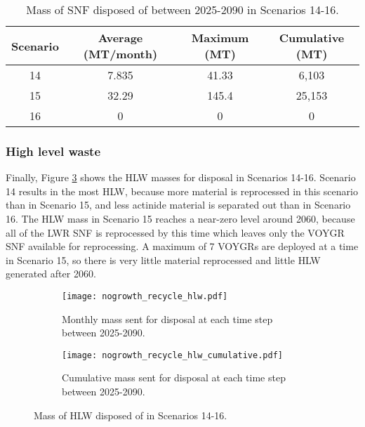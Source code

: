 \begin{table}[h!]
    \centering 
    \caption{Mass of SNF disposed of between 2025-2090 in 
    Scenarios 14-16.}
    \label{tab:s14-16_snf}
    \begin{tabular}{c c c c}
        \hline 
        Scenario & Average (MT/month) & Maximum (MT) & Cumulative (MT) \\
        \hline
        14 & 7.835 & 41.33 & 6,103\\
        15 & 32.29 & 145.4 & 25,153 \\
        16 & 0 & 0 & 0 \\
        \hline
    \end{tabular}
\end{table}

\subsubsection{High level waste}
Finally, Figure \ref{fig:nogrowth_recycle_hlw} shows the 
\gls{HLW} masses for disposal in Scenarios 14-16. Scenario 
14 results in the most \gls{HLW}, because more 
material is reprocessed in this scenario than in Scenario 15, 
and less actinide material is separated out than in 
Scenario 16. The \gls{HLW} mass in Scenario 15 reaches a 
near-zero level around 2060, because all of the \gls{LWR} 
\gls{SNF} is reprocessed by this time which leaves only
the VOYGR \gls{SNF} available for reprocessing. A 
maximum of 7 VOYGRs are deployed at a time in Scenario 
15, so there is very little material reprocessed and 
little \gls{HLW} generated after 2060. 

\begin{figure}[h!]
    \centering
    \begin{subfigure}[b]{0.49\textwidth}
        \centering
        \texttt{[image: nogrowth\_recycle\_hlw.pdf]}
        \caption{Monthly mass sent for disposal 
        at each time step between 2025-2090.}
        \label{fig:nogrowth_recycle_hlw_all}
    \end{subfigure}
    \hfill
    \begin{subfigure}[b]{0.49\textwidth}
        \centering
        \texttt{[image: nogrowth\_recycle\_hlw\_cumulative.pdf]}
        \caption{Cumulative mass sent for disposal 
        at each time step between 2025-2090.}
        \label{fig:nogrowth_recycle_hlw_cumulative}
    \end{subfigure}
       \caption{Mass of \gls{HLW} disposed of in Scenarios 14-16.}
       \label{fig:nogrowth_recycle_hlw}
\end{figure}

